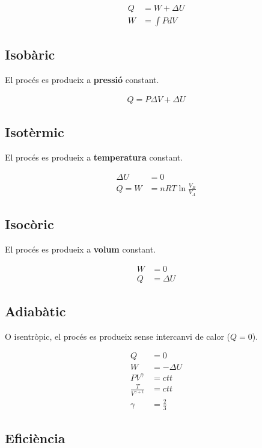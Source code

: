 \begin{align}
    Q &= W + \Delta U \\
    W &= \int P dV
\end{align}

\subsection{Isobàric}
\label{sub:isobaric}
El procés es produeix a \textbf{pressió} constant.

\begin{align}
    Q = P \Delta V + \Delta U
\end{align}

\subsection{Isotèrmic}
\label{sub:isotermic}
El procés es produeix a \textbf{temperatura} constant.

\begin{align}
    \Delta U &= 0\\
    Q = W &= nRT\ln\frac{V_B}{V_A}
\end{align}

\subsection{Isocòric}
\label{sub:isocoric}
El procés es produeix a \textbf{volum} constant.

\begin{align}
    W &= 0\\
    Q &= \Delta U
\end{align}

\pagebreak

\subsection{Adiabàtic}
\label{sub:adiabatic}
O isentròpic, el procés es produeix sense intercanvi de calor ($Q=0$).

\begin{align}
    Q &= 0\nonumber\\
    W &= -\Delta U \\
    PV^\gamma &= ctt \\
    \frac{T}{V^{\gamma + 1}} &= ctt \\
    \gamma &= \frac{2}{3} \nonumber
\end{align}

\subsection{Eficiència}
\label{sub:eficiencia}

